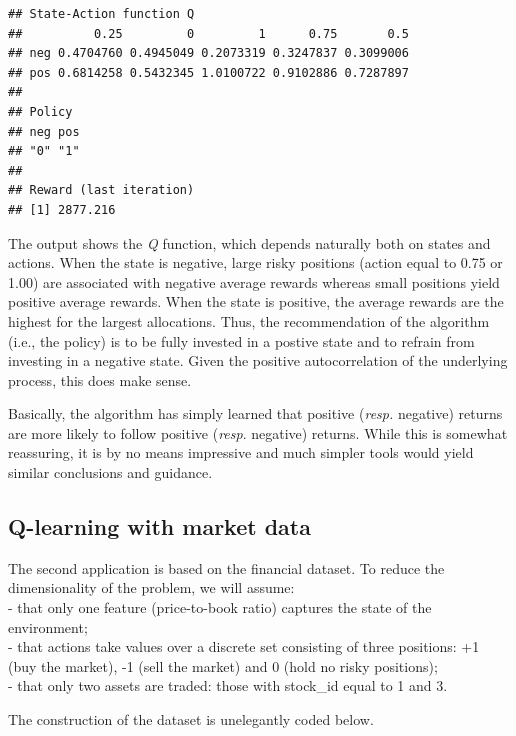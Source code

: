 \documentclass[]{krantz}
\theoremstyle{definition}
\theoremstyle{definition}
\theoremstyle{definition}
\theoremstyle{remark}
\begin{document}
\begin{verbatim}
## State-Action function Q
##          0.25         0         1      0.75       0.5
## neg 0.4704760 0.4945049 0.2073319 0.3247837 0.3099006
## pos 0.6814258 0.5432345 1.0100722 0.9102886 0.7287897
## 
## Policy
## neg pos 
## "0" "1" 
## 
## Reward (last iteration)
## [1] 2877.216
\end{verbatim}

\normalsize

The output shows the \emph{Q} function, which depends naturally both on
states and actions. When the state is negative, large risky positions
(action equal to 0.75 or 1.00) are associated with negative average
rewards whereas small positions yield positive average rewards. When the
state is positive, the average rewards are the highest for the largest
allocations. Thus, the recommendation of the algorithm (i.e., the
policy) is to be fully invested in a postive state and to refrain from
investing in a negative state. Given the positive autocorrelation of the
underlying process, this does make sense.

Basically, the algorithm has simply learned that positive (\emph{resp.}
negative) returns are more likely to follow positive (\emph{resp}.
negative) returns. While this is somewhat reassuring, it is by no means
impressive and much simpler tools would yield similar conclusions and
guidance.

\hypertarget{q-learning-with-market-data}{%
\subsection{Q-learning with market
data}\label{q-learning-with-market-data}}

The second application is based on the financial dataset. To reduce the
dimensionality of the problem, we will assume:\\
- that only one feature (price-to-book ratio) captures the state of the
environment;\\
- that actions take values over a discrete set consisting of three
positions: +1 (buy the market), -1 (sell the market) and 0 (hold no
risky positions);\\
- that only two assets are traded: those with stock\_id equal to 1 and
3.

The construction of the dataset is unelegantly coded below.

\footnotesize
\end{document}
